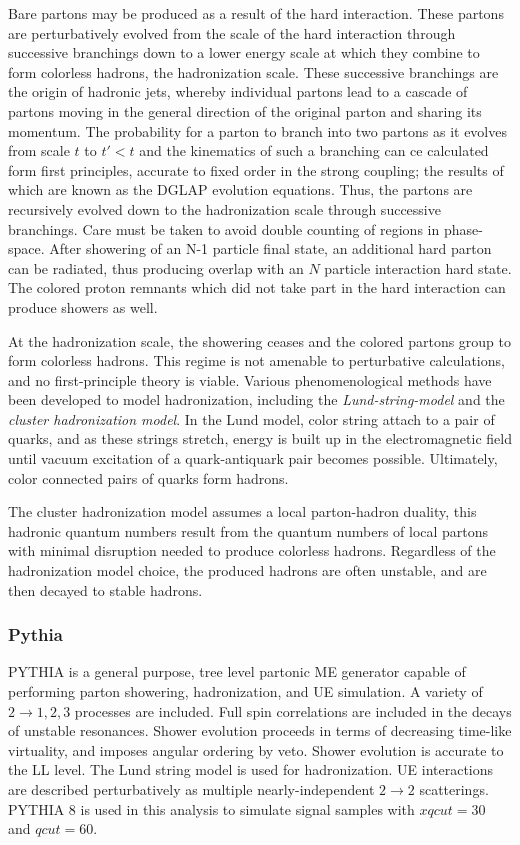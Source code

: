 Bare partons may be produced as a result of the hard interaction. These partons are perturbatively evolved from the scale of the hard interaction through successive branchings down to a lower energy scale at which they combine to form colorless hadrons, the hadronization scale. These successive branchings are the origin of hadronic jets, whereby individual partons lead to a cascade of partons moving in the general direction of the original parton and sharing its momentum. The probability for a parton to branch into two partons as it evolves from scale $t$ to $t'<t$ and the kinematics of such a branching can ce calculated form first principles, accurate to fixed order in the strong coupling; the results of which are known as the DGLAP evolution equations. Thus, the partons are recursively evolved down to the hadronization scale through successive branchings. Care must be taken to avoid double counting of regions in phase-space. After showering of an N-1 particle final state, an additional hard parton can be radiated, thus producing overlap with an $N$ particle interaction hard state. The colored proton remnants which did not take part in the hard interaction can produce showers as well. 

At the hadronization scale, the showering ceases and the colored partons group to form colorless hadrons. This regime is not amenable to perturbative calculations, and no first-principle theory is viable. Various phenomenological methods have been developed to model hadronization, including the \textit{Lund-string-model} and the \textit{cluster hadronization model}. In the Lund model, color string attach to a pair of quarks, and as these strings stretch, energy is built up in the electromagnetic field until vacuum excitation of a quark-antiquark pair becomes possible. Ultimately, color connected pairs of quarks form hadrons. 

The cluster hadronization model assumes a local parton-hadron duality, this hadronic quantum numbers result from the quantum numbers of local partons with minimal disruption needed to produce colorless hadrons. Regardless of the hadronization model choice, the produced hadrons are often unstable, and are then decayed to stable hadrons.

\subsubsection{Pythia}

PYTHIA is a general purpose, tree level partonic ME generator capable of performing parton showering, hadronization, and UE simulation. A variety of $2\rightarrow1,2,3$ processes are included. Full spin correlations are included in the decays of unstable resonances. Shower evolution proceeds in terms of decreasing time-like virtuality, and imposes angular ordering by veto. Shower evolution is accurate to the LL level. The Lund string model is used for hadronization. UE interactions are described perturbatively as multiple nearly-independent $2\rightarrow 2$ scatterings. PYTHIA 8 is used in this analysis to simulate signal samples with $xqcut=30$ and $qcut=60$.

